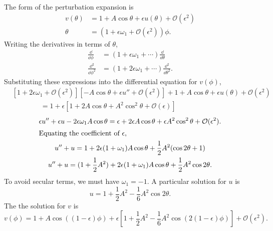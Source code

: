 \begin{Solution}
  The form of the perturbation expansion is 
  \begin{align*}
    v(\theta) &= 1 + A\cos\theta + \epsilon u(\theta) + \mathcal{O}(\epsilon^2) \\
    \theta &= (1+\epsilon\omega_1 + \mathcal{O}(\epsilon^2))\phi.
  \end{align*}
  Writing the derivatives in terms of $\theta$,
  \begin{align*}
    \frac{\dd}{\dd \phi} &= (1 + \epsilon \omega_1 + \cdots)\frac{\dd}{\dd \theta} \\
    \frac{\dd^2}{\dd \phi^2} &= (1 + 2 \epsilon \omega_1 + \cdots) \frac{\dd^2}{\dd \theta^2}.
  \end{align*}
  Substituting these expressions into the differential equation for $v(\phi)$,
  \begin{align*}
    &\left[1+2\epsilon\omega_1+\mathcal{O}(\epsilon^2)\right]\left[-A\cos\theta
      +\epsilon u'' +\mathcal{O}(\epsilon^2)\right] + 1+A\cos\theta
    +\epsilon u(\theta) +\mathcal{O}(\epsilon^2) \\
    &\qquad\qquad
    =1+\epsilon\left[1+2A\cos\theta+A^2\cos^2\theta+\mathcal{O}(\epsilon)
    \right] 
  \end{align*}
  \begin{gather*}
    \epsilon u'' + \epsilon u - 2\epsilon\omega_1 A\cos\theta = \epsilon
    + 2\epsilon A\cos\theta +\epsilon A^2\cos^2\theta 
    +\mathcal{O}(\epsilon^2). \\
    \intertext{Equating the coefficient of $\epsilon$,}
    u''+u=1+2\epsilon(1+\omega_1)A\cos\theta+\frac{1}{2}A^2(\cos 2\theta+1) \\
    u''+u=(1+\frac{1}{2}A^2) + 2\epsilon(1+\omega_1)A\cos\theta
    +\frac{1}{2}A^2\cos 2\theta.
  \end{gather*}
  To avoid secular terms, we must have $\omega_1=-1$.  A particular solution
  for $u$ is
  \[ u=1+\frac{1}{2}A^2-\frac{1}{6}A^2\cos 2\theta. \]
  The the solution for $v$ is
  \[ 
  \boxed{ 
    v(\phi)=1+A\cos((1-\epsilon)\phi)+\epsilon\left[1+\frac{1}{2}A^2
      -\frac{1}{6}A^2\cos(2(1-\epsilon)\phi)\right] +\mathcal{O}(\epsilon^2).
    }
  \]
\end{Solution}



